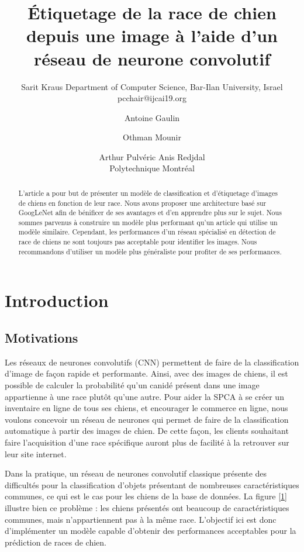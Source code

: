 \documentclass{article}
\title{Étiquetage de la race de chien depuis une image à l'aide d'un réseau de neurone convolutif}
\author{
    Sarit Kraus
    \affiliations
    Department of Computer Science, Bar-Ilan University, Israel \emails
    pcchair@ijcai19.org
}
\author{
Antoine Gaulin\and
Othman Mounir\and
Arthur Pulvéric\And
Anis Redjdal\\
\affiliations
Polytechnique Montréal\\
}
\begin{document}
\maketitle

\begin{abstract}
L'article a pour but de présenter un modèle de classification et d'étiquetage
d'images de chiens en fonction de leur race. Nous avons proposer une
architecture basé sur GoogLeNet afin de bénificer de ses avantages et d'en
apprendre plus sur le sujet. Nous sommes parvenus à construire un modèle plus 
performant qu'un article qui utilise un modèle similaire. Cependant, les
performances d'un réseau spécialisé en détection de race de chiens ne sont
toujours pas acceptable pour identifier les images. Nous recommandons d'utiliser
un modèle plus généraliste pour profiter de ses performances.

\end{abstract}

\section{Introduction}

\subsection{Motivations}
Les réseaux de neurones convolutifs (CNN) permettent de faire de la
classification d'image de façon rapide et performante. Ainsi, avec des images de
chiens, il est possible de calculer la probabilité qu'un canidé présent dans une
image appartienne à une race plutôt qu’une autre. Pour aider la SPCA à se créer
un inventaire en ligne de tous ses chiens, et encourager le commerce en ligne,
nous voulons concevoir un réseau de neurones qui permet de faire de la
classification automatique à partir des images de chien. De cette façon, les
clients souhaitant faire l'acquisition d'une race spécifique auront plus de
facilité à la retrouver sur leur site internet.

Dans la pratique, un réseau de neurones convolutif classique présente des
difficultés pour la classification d’objets présentant de nombreuses
caractéristiques communes, ce qui est le cas pour les chiens de la base de 
données. La figure \ref{1} illustre bien ce problème : les chiens présentés ont
beaucoup de caractéristiques communes, mais n’appartiennent pas à la même race.
L’objectif ici est donc d’implémenter un modèle capable d’obtenir des
performances acceptables pour la prédiction de races de chien.
\end{document}
